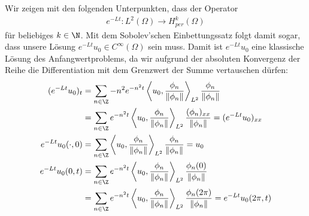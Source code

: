 \begin{solution}
Wir zeigen mit den folgenden Unterpunkten, dass der Operator
\begin{align*}
  e^{-Lt}: L^2(\Omega) \to H_{per}^k(\Omega)
\end{align*}
für beliebiges $k \in \N$. Mit dem Sobolev'schen Einbettungssatz folgt damit
sogar, dass unsere Lösung $e^{-Lt}u_0 \in C^{\infty}(\Omega)$ sein muss.
Damit ist $e^{-Lt}u_0$ eine klassische Lösung des Anfangwertproblems, da
wir aufgrund der absoluten Konvergenz der Reihe die Differentiation mit dem
Grenzwert der Summe vertauschen dürfen:
\begin{align*}
  (e^{-Lt}u_0)_t &= \sum_{n\in\Z}-n^2e^{-n^2t}\left\langle u_0,
  \frac{\phi_{n}}{\left\|\phi_{n}\right\|}\right\rangle_{L^{2}}
  \frac{\phi_{n}}{\left\|\phi_{n}\right\|} \\
  &= \sum_{n\in\Z}e^{-n^2t}\left\langle u_0,
  \frac{\phi_{n}}{\left\|\phi_{n}\right\|}\right\rangle_{L^{2}}
  \frac{(\phi_{n})_{xx}}{\left\|\phi_{n}\right\|}
  = (e^{-Lt}u_0)_{xx} \\
  e^{-Lt}u_0(\cdot,0) &= \sum_{n\in\Z}\left\langle u_0,
  \frac{\phi_{n}}{\left\|\phi_{n}\right\|}\right\rangle_{L^{2}}
  \frac{\phi_{n}}{\left\|\phi_{n}\right\|} = u_0 \\
  e^{-Lt}u_0(0,t) &= \sum_{n\in\Z}e^{-n^2t}\left\langle u_0,
  \frac{\phi_{n}}{\left\|\phi_{n}\right\|}\right\rangle_{L^{2}}
  \frac{\phi_{n}(0)}{\left\|\phi_{n}\right\|} \\
  &= \sum_{n\in\Z}e^{-n^2t}\left\langle u_0,
  \frac{\phi_{n}}{\left\|\phi_{n}\right\|}\right\rangle_{L^{2}}
  \frac{\phi_{n}(2\pi)}{\left\|\phi_{n}\right\|} = e^{-Lt}u_0(2\pi,t)
\end{align*}


\end{solution}
